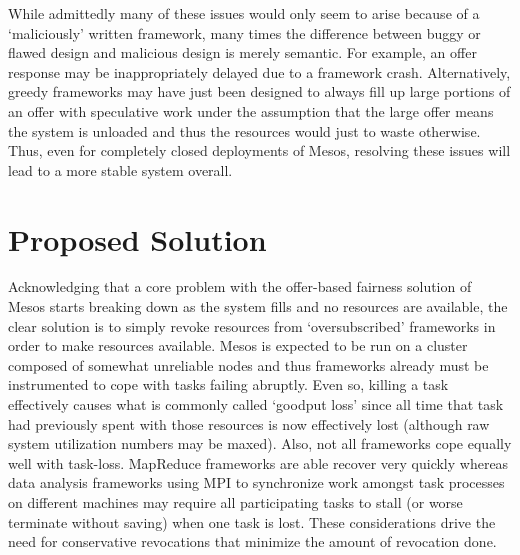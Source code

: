 While admittedly many of these issues would only seem to arise because of a `maliciously'
written framework, many times the difference between buggy or flawed design and malicious
design is merely semantic. For example, an offer response may be inappropriately delayed due to
a framework crash. Alternatively, greedy frameworks may have just been designed to always fill
up large portions of an offer with speculative work under the assumption that the large offer
means the system is unloaded and thus the resources would just to waste otherwise. Thus, even
for completely closed deployments of Mesos, resolving these issues will lead to a more stable
system overall. 

\section{Proposed Solution}
Acknowledging that a core problem with the offer-based fairness solution of Mesos starts
breaking down as the system fills and no resources are available, the clear solution is to
simply revoke resources from `oversubscribed' frameworks in order to make resources available.
Mesos is expected to be run on a cluster composed of somewhat unreliable nodes and thus
frameworks already must be instrumented to cope with tasks failing abruptly. Even so, killing a
task effectively causes what is commonly called `goodput loss' since all time that task had
previously spent with those resources is now effectively lost (although raw system utilization
numbers may be maxed). Also, not all frameworks cope equally well with task-loss. MapReduce
frameworks are able recover very quickly whereas data analysis frameworks using MPI to
synchronize work amongst task processes on different machines may require all participating
tasks to stall (or worse terminate without saving) when one task is lost. These considerations
drive the need for conservative revocations that minimize the amount of revocation done.

